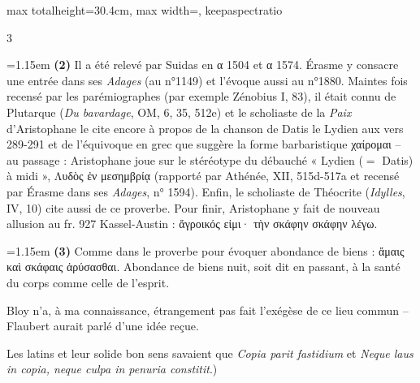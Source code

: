 \documentclass[11pt,twoside]{book}
\newcommand{\currHeadLE}{}
\newcommand{\currHeadRE}{}
\newcommand{\italique}[1]{\textit{#1}}
\newcommand{\latin}[1]{\textit{#1}}
\begin{document}
\begin{adjustbox}{max totalheight=30.4cm, max width=\textwidth, keepaspectratio}
\begin{minipage}{\textwidth}
{\begin{multicols}{3}
\par\vspace{1.5pt}
\noindent\hangindent=1.15em {\color{sepiaNote}\textbf{(2)}} Il a été relevé par Suidas en α 1504 et α 1574. Érasme y consacre une entrée dans ses \italique{Adages} (au n°1149) et l'évoque aussi au n°1880. Maintes fois recensé par les parémiographes (par exemple Zénobius I, 83), il était connu de Plutarque (\italique{Du bavardage}, OM, 6, 35, 512e) et le scholiaste de la \italique{Paix} d'Aristophane le cite encore à propos de la chanson de Datis le Lydien aux vers 289-291 et de l'équivoque en grec que suggère la forme barbaristique χαίρομαι -- au passage : Aristophane joue sur le stéréotype du débauché « Lydien ($=$ Datis) à midi », Λυδὸς ἐν μεσημβρίᾳ (rapporté par Athénée, XII, 515d-517a et recensé par Érasme dans ses \italique{Adages}, n° 1594). Enfin, le scholiaste de Théocrite (\italique{Idylles}, IV, 10) cite aussi de ce proverbe. Pour finir, Aristophane y fait de nouveau allusion au fr. 927 Kassel-Austin : ἄγροικός εἰμι· τὴν σκάφην σκάφην λέγω.
\par\vspace{1.5pt}
\noindent\hangindent=1.15em {\color{sepiaNote}\textbf{(3)}} Comme dans le proverbe pour évoquer abondance de biens : ἄμαις καὶ σκάφαις ἀρύσασθαι. Abondance de biens nuit, soit dit en passant, à la santé du corps comme celle de l'esprit.
\par\vspace{1.5pt}
\noindent Bloy n'a, à ma connaissance, étrangement pas fait l'exégèse de ce lieu commun -- Flaubert aurait parlé d'une idée reçue.
\par\vspace{1.5pt}
\noindent Les latins et leur solide bon sens savaient que \latin{Copia parit fastidium} et \latin{Neque laus in copia, neque culpa in penuria constitit}.)
\par\end{multicols}}
\end{minipage}\end{adjustbox}
\clearpage
\renewcommand{\currHeadLE}{ΑΡΙΣΤΟΦΑΝΟΥΣ ΘΕΣΜΟΦΟΡΙΑΖΟΥΣΑΙ · CONSPECTUS FOLIORUM CODICIS RAVENNATIS}
\renewcommand{\currHeadRE}{Les 30 folios des Thesmophories (ff. 162v–177r)}
\end{document}
